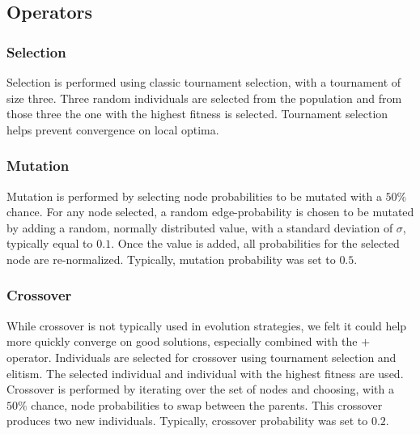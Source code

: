 \subsection{Operators}
\subsubsection{Selection}
Selection is performed using classic tournament selection, with
a tournament of size three. Three random individuals are selected
from the population and from those three the one with the highest
fitness is selected. Tournament selection helps prevent convergence
on local optima.
\subsubsection{Mutation}
Mutation is performed by selecting node probabilities to be mutated
with a $50\%$ chance. For any node selected, a random edge-probability
is chosen to be mutated by adding a random, normally distributed value,
with a standard deviation of $\sigma$, typically equal to $0.1$. Once
the value is added, all probabilities for the selected node are
re-normalized. Typically, mutation probability was set to $0.5$.
\subsubsection{Crossover} While crossover is not typically used
in evolution strategies, we felt it could help more quickly converge
on good solutions, especially combined with the $+$ operator.
Individuals are selected for crossover using tournament selection and
elitism. The selected individual and individual with the highest fitness
are used. 
Crossover is performed by iterating over the set of nodes and choosing,
with a $50\%$ chance, node probabilities to swap between the parents.
This crossover produces two new individuals. Typically, crossover
probability was set to $0.2$. 

